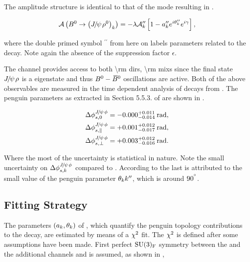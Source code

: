 \noindent The amplitude structure is identical to that of the \BsJpsiKst mode resulting in .

\begin{equation}
  \mathcal{A} \left( B^0\rightarrow \left({J\mskip -3mu/\mskip -2mu\psi\mskip 2mu} \rho^0\right)_{k} \right) = -\lambda \mathcal{A}_{k}'' \left[  1 - a_k'' e^{i\theta_k''} e^{i\gamma}  \right],
  \label{bsjpsirho_amp}
\end{equation}

\noindent where the double primed symbol ${}^{\prime\prime}$ from here on labels parameters related to the \BdJpsiRho decay.
Note again the absence of the suppression factor $\epsilon$.

The \BdJpsiRho channel provides access to both \Acp{\rm dir}, \Acp{\rm mix} since the final state ${J\mskip -3mu/\mskip -2mu\psi\mskip 2mu}\rho$ is
a \CP eigenstate and thus $B^0-\kern 0.18em\overline{\kern -0.18em B}{}^0$ oscillations are active. Both of the above observables are measured in the
time dependent analysis of \BdJpsipipi decays from \lhcb \cite{Aaij:2014vda}. The penguin parameters as extracted
in Section 5.5.3. of \cite{DeBruyn-thesis} are shown in .

\begin{subequations}
  \label{delta_phis_jpsirho}
  \begin{align}
    \Delta\phi^{{J\mskip -3mu/\mskip -2mu\psi\mskip 2mu}\phi}_{s,{0}}         & = -0.000^{+0.011}_{-0.014}\:\text{rad},\\
    \Delta\phi^{{J\mskip -3mu/\mskip -2mu\psi\mskip 2mu}\phi}_{s,{\parallel}} & = +0.001^{+0.012}_{-0.017}\:\text{rad},\\
    \Delta\phi^{{J\mskip -3mu/\mskip -2mu\psi\mskip 2mu}\phi}_{s,{\perp}}     & = +0.003^{+0.012}_{-0.016}\:\text{rad}.
  \end{align}
\end{subequations}

\noindent Where the most of the uncertainty is statistical in nature. Note the small uncertainty on
$\Delta\phi^{{J\mskip -3mu/\mskip -2mu\psi\mskip 2mu}\phi}_{s,{k}}$ compared to . According to \cite{DeBruyn-thesis} the last is attributed
to the small value of the penguin parameter $\theta_k{k}''$, which is around $90^{^{\circ}}$.

\subsection{Fitting Strategy}
\label{penguin_chi2_fit}

The parameters $(a_k,\theta_k)$ of , which quantify the penguin topology contributions
to the \BsJpsiPhi decay, are estimated by means of a $\chi^2$ fit. The $\chi^2$ is defined after some assumptions have
been made. First perfect $\mathrm{SU}(3)_{\rm F}$ symmetry between the \BsJpsiPhi and the additional channels \BsJpsiKst
and \BdJpsiRho is assumed, as shown in ,

